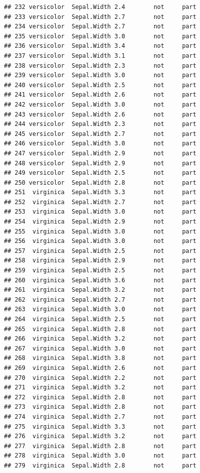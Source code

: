 \documentclass[krantz2]{krantz}\usepackage{knitr}%
\begin{document}
\begin{knitrout}
\begin{kframe}
\begin{verbatim}
## 232 versicolor  Sepal.Width 2.4        not     part
## 233 versicolor  Sepal.Width 2.7        not     part
## 234 versicolor  Sepal.Width 2.7        not     part
## 235 versicolor  Sepal.Width 3.0        not     part
## 236 versicolor  Sepal.Width 3.4        not     part
## 237 versicolor  Sepal.Width 3.1        not     part
## 238 versicolor  Sepal.Width 2.3        not     part
## 239 versicolor  Sepal.Width 3.0        not     part
## 240 versicolor  Sepal.Width 2.5        not     part
## 241 versicolor  Sepal.Width 2.6        not     part
## 242 versicolor  Sepal.Width 3.0        not     part
## 243 versicolor  Sepal.Width 2.6        not     part
## 244 versicolor  Sepal.Width 2.3        not     part
## 245 versicolor  Sepal.Width 2.7        not     part
## 246 versicolor  Sepal.Width 3.0        not     part
## 247 versicolor  Sepal.Width 2.9        not     part
## 248 versicolor  Sepal.Width 2.9        not     part
## 249 versicolor  Sepal.Width 2.5        not     part
## 250 versicolor  Sepal.Width 2.8        not     part
## 251  virginica  Sepal.Width 3.3        not     part
## 252  virginica  Sepal.Width 2.7        not     part
## 253  virginica  Sepal.Width 3.0        not     part
## 254  virginica  Sepal.Width 2.9        not     part
## 255  virginica  Sepal.Width 3.0        not     part
## 256  virginica  Sepal.Width 3.0        not     part
## 257  virginica  Sepal.Width 2.5        not     part
## 258  virginica  Sepal.Width 2.9        not     part
## 259  virginica  Sepal.Width 2.5        not     part
## 260  virginica  Sepal.Width 3.6        not     part
## 261  virginica  Sepal.Width 3.2        not     part
## 262  virginica  Sepal.Width 2.7        not     part
## 263  virginica  Sepal.Width 3.0        not     part
## 264  virginica  Sepal.Width 2.5        not     part
## 265  virginica  Sepal.Width 2.8        not     part
## 266  virginica  Sepal.Width 3.2        not     part
## 267  virginica  Sepal.Width 3.0        not     part
## 268  virginica  Sepal.Width 3.8        not     part
## 269  virginica  Sepal.Width 2.6        not     part
## 270  virginica  Sepal.Width 2.2        not     part
## 271  virginica  Sepal.Width 3.2        not     part
## 272  virginica  Sepal.Width 2.8        not     part
## 273  virginica  Sepal.Width 2.8        not     part
## 274  virginica  Sepal.Width 2.7        not     part
## 275  virginica  Sepal.Width 3.3        not     part
## 276  virginica  Sepal.Width 3.2        not     part
## 277  virginica  Sepal.Width 2.8        not     part
## 278  virginica  Sepal.Width 3.0        not     part
## 279  virginica  Sepal.Width 2.8        not     part

\end{verbatim}
\end{kframe}
\end{knitrout}
\end{document}

